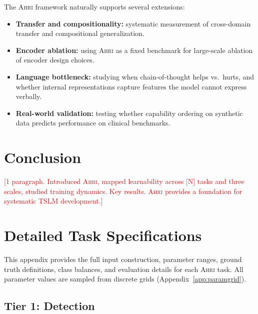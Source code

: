 \documentclass[11pt]{article}
\newcommand{\ahri}{\textsc{Ahri}}
\newcommand{\placeholder}[1]{\textcolor{red}{[#1]}}
\begin{document}
The \ahri{} framework naturally supports several extensions:

\begin{itemize}[nosep]
    \item \textbf{Transfer and compositionality:} systematic measurement of cross-domain transfer and compositional generalization.
    \item \textbf{Encoder ablation:} using \ahri{} as a fixed benchmark for large-scale ablation of encoder design choices.
    \item \textbf{Language bottleneck:} studying when chain-of-thought helps vs.\ hurts, and whether internal representations capture features the model cannot express verbally.
    \item \textbf{Real-world validation:} testing whether capability ordering on synthetic data predicts performance on clinical benchmarks.
\end{itemize}


\section{Conclusion}
\label{sec:conclusion}

\placeholder{1 paragraph. Introduced \ahri{}, mapped learnability across [N] tasks and three scales, studied training dynamics. Key results. \ahri{} provides a foundation for systematic TSLM development.}


\appendix

\section{Detailed Task Specifications}
\label{app:taskdetails}

This appendix provides the full input construction, parameter ranges, ground truth definitions, class balances, and evaluation details for each \ahri{} task. All parameter values are sampled from discrete grids (Appendix~\ref{app:paramgrid}).

\subsection{Tier 1: Detection}
\end{document}

